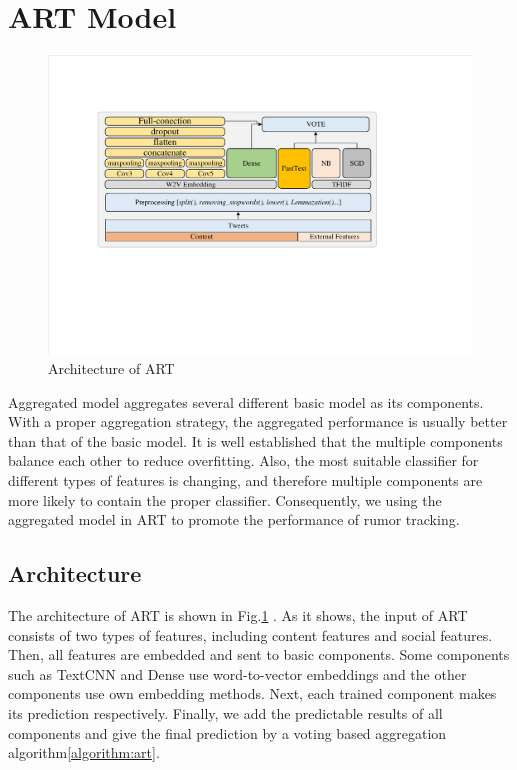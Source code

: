 \section{ART Model}
\label{sec:model}

\begin{figure}[htbp]
	\hspace{0ex}
	\vspace{0ex}
	\centering
	\includegraphics[width = \textwidth]{fig/structure}
	\caption{Architecture of ART}
	\label{fig:architecture}
\end{figure}

Aggregated model \cite{DBLP:conf/iccl2/Soto-FerrariCEH19, DBLP:conf/icccsec/WenYTWZSTYW18, DBLP:conf/wsc/LaippleMSWF18} aggregates several different basic model as its components. With a proper aggregation strategy, the aggregated performance is usually better than that of the basic model. It is well established that the multiple components balance each other to reduce overfitting. Also, the most suitable classifier for different types of features is changing, and therefore multiple components are more likely to contain the proper classifier. Consequently, we using the aggregated model in ART to promote the performance of rumor tracking. 

\subsection{Architecture}
\label{sec:architecture}
The architecture of ART is shown in Fig.\ref{fig:architecture} . As it shows, the input of  ART consists of two types of features, including content features and social features. Then, all features are embedded and sent to basic components.  Some components such as TextCNN and Dense use word-to-vector embeddings and the other components use own embedding methods. Next, each trained component makes its prediction respectively. Finally, we add the predictable results of all components and give the final prediction by a voting based aggregation algorithm\ref{algorithm:art}.

